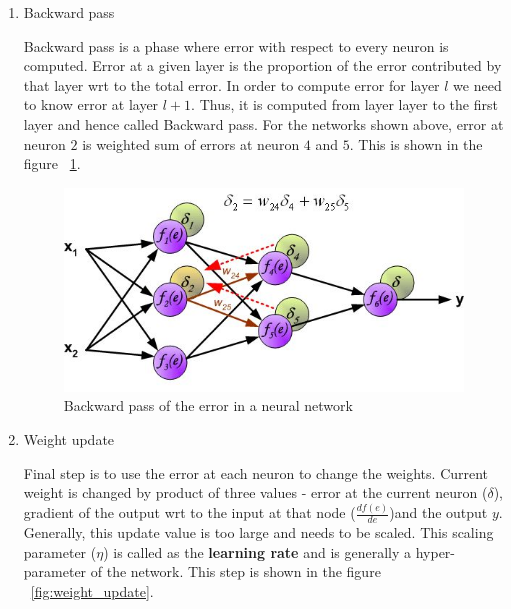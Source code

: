 \begin{enumerate}
	\item Backward pass

Backward pass is a phase where error with respect to every neuron is computed. Error at a given layer is the proportion of the error contributed by that layer wrt to the total error. In order to compute error for layer $l$ we need to know error at layer $l+1$. 
Thus, it is computed from layer layer to the first layer and hence called Backward pass. For the networks shown above, error at neuron $2$ is weighted sum of errors at neuron $4$ and $5$. This is shown in the figure ~\ref{fig:error2}.

\begin{figure}[H]
	\centering
   \includegraphics[scale=0.66]{figures/intro/error2.bmp}
   \caption[Backward pass]{Backward pass of the error in a neural network}
   \label{fig:error2}
\end{figure}


	\item Weight update

Final step is to use the error at each neuron to change the weights. Current weight is changed by product of three values - error at the current neuron ($\delta$), gradient of the output wrt to the input at that node ($\frac{df(e)}{de}$)and the output $y$. Generally, this update value is too large and needs to be scaled. This scaling parameter ($\eta$) is called as the \textbf{learning rate} and is generally a hyper-parameter of the network. This step is shown in the figure ~\ref{fig:weight_update}.


\end{enumerate}
